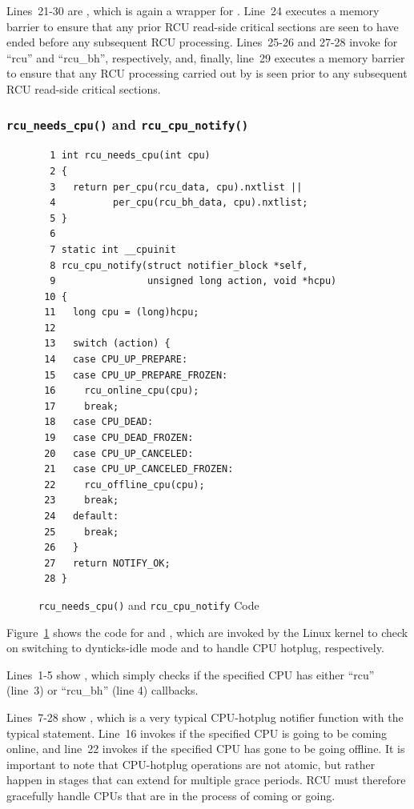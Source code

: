 Lines~21-30 are , which is again a
wrapper for .
Line~24 executes a memory barrier to ensure that any prior RCU
read-side critical sections are seen to have ended before any
subsequent RCU processing.
Lines~25-26 and 27-28 invoke  for
``rcu'' and ``rcu\_bh'', respectively, and, finally,
line~29 executes a memory barrier to ensure that any RCU
processing carried out by 
is seen prior to any subsequent RCU read-side critical sections.

\subsubsection{{\tt rcu\_needs\_cpu()} and {\tt rcu\_cpu\_notify()}}
\label{app:rcuimpl:rcutreewt:rcu-needs-cpu and rcu-cpu-notify}

\begin{figure}[tbp]
{ \scriptsize
\begin{verbatim}
  1 int rcu_needs_cpu(int cpu)
  2 {
  3   return per_cpu(rcu_data, cpu).nxtlist ||
  4          per_cpu(rcu_bh_data, cpu).nxtlist;
  5 }
  6
  7 static int __cpuinit
  8 rcu_cpu_notify(struct notifier_block *self,
  9                unsigned long action, void *hcpu)
 10 {
 11   long cpu = (long)hcpu;
 12
 13   switch (action) {
 14   case CPU_UP_PREPARE:
 15   case CPU_UP_PREPARE_FROZEN:
 16     rcu_online_cpu(cpu);
 17     break;
 18   case CPU_DEAD:
 19   case CPU_DEAD_FROZEN:
 20   case CPU_UP_CANCELED:
 21   case CPU_UP_CANCELED_FROZEN:
 22     rcu_offline_cpu(cpu);
 23     break;
 24   default:
 25     break;
 26   }
 27   return NOTIFY_OK;
 28 }
\end{verbatim}
}
\caption{{\tt rcu\_needs\_cpu()} and {\tt rcu\_cpu\_notify}  Code}
\label{fig:app:rcuimpl:rcutreewt:Code for rcu-needs-cpu and rcu-cpu-notify}
\end{figure}

Figure~\ref{fig:app:rcuimpl:rcutreewt:Code for rcu-needs-cpu and rcu-cpu-notify}
shows the code for  and ,
which are invoked by the Linux kernel to check on switching to
dynticks-idle mode and to handle CPU hotplug, respectively.

Lines~1-5 show , which simply checks if the specified
CPU has either ``rcu'' (line~3) or ``rcu\_bh'' (line 4) callbacks.

Lines~7-28 show , which is a very typical
CPU-hotplug notifier function with the typical  statement.
Line~16 invokes  if the specified CPU is going
to be coming online, and line~22 invokes  if
the specified CPU has gone to be going offline.
It is important to note that CPU-hotplug operations are not atomic,
but rather happen in stages that can extend for multiple grace periods.
RCU must therefore gracefully handle CPUs that are in the process
of coming or going.

